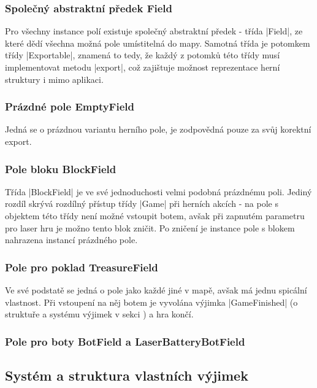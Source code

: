 \subsubsection{Společný abstraktní předek Field}

\begin{sloppypar}
	Pro všechny instance polí existuje společný abstraktní předek - třída \ic|Field|, ze které dědí všechna možná pole umístitelná do mapy. Samotná třída je potomkem třídy \ic|Exportable|, znamená to tedy, že každý z potomků této třídy musí implementovat metodu \ic|export|, což zajištuje možnost reprezentace herní struktury i mimo aplikaci.
\end{sloppypar}

\subsubsection{Prázdné pole EmptyField}

Jedná se o prázdnou variantu herního pole, je zodpovědná pouze za svůj korektní export.

\subsubsection{Pole bloku BlockField}

Třída \ic|BlockField| je ve své jednoduchosti velmi podobná prázdnému poli. Jediný rozdíl skrývá rozdílný přístup třídy \ic|Game| při herních akcích - na pole s objektem této třídy není možné vstoupit botem, avšak při zapnutém parametru pro laser hru je možno tento blok zničit. Po zničení je instance pole s blokem nahrazena instancí prázdného pole.

\subsubsection{Pole pro poklad TreasureField}

Ve své podstatě se jedná o pole jako každé jiné v mapě, avšak má jednu spicální vlastnost. Při vstoupení na něj botem je vyvolána výjimka \ic|GameFinished| (o struktuře a systému výjimek v sekci ) a hra končí. 

\subsubsection{Pole pro boty BotField a LaserBatteryBotField}

\subsection{Systém a struktura vlastních výjimek}
\label{subsec:custom-exceptions}

